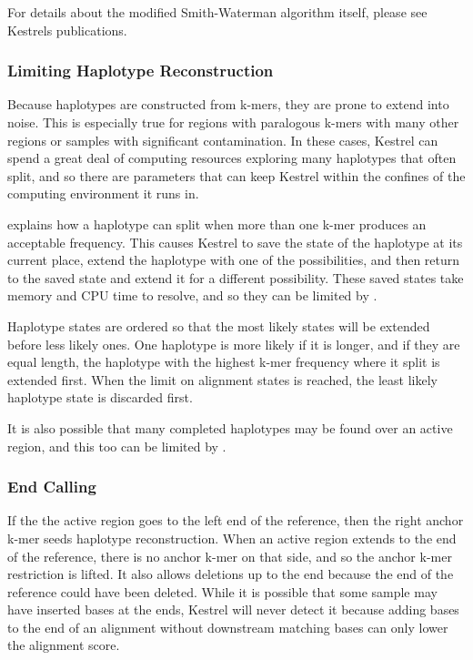 For details about the modified Smith-Waterman algorithm itself, please see Kestrels publications.


\subsubsection{Limiting Haplotype Reconstruction}
\label{sec.process.haplo.limits}

Because haplotypes are constructed from k-mers, they are prone to extend into noise. This is especially true for regions with paralogous k-mers with many other regions or samples with significant contamination. In these cases, Kestrel can spend a great deal of computing resources exploring many haplotypes that often split, and so there are parameters that can keep Kestrel within the confines of the computing environment it runs in.

 explains how a haplotype can split when more than one k-mer produces an acceptable frequency. This causes Kestrel to save the state of the haplotype at its current place, extend the haplotype with one of the possibilities, and then return to the saved state and extend it for a different possibility. These saved states take memory and CPU time to resolve, and so they can be limited by .

Haplotype states are ordered so that the most likely states will be extended before less likely ones. One haplotype is more likely if it is longer, and if they are equal length, the haplotype with the highest k-mer frequency where it split is extended first. When the limit on alignment states is reached, the least likely haplotype state is discarded first.

It is also possible that many completed haplotypes may be found over an active region, and this too can be limited by .


\subsubsection{End Calling}
\label{sec.process.haplo.ends}

If the the active region goes to the left end of the reference, then the right anchor k-mer seeds haplotype reconstruction. When an active region extends to the end of the reference, there is no anchor k-mer on that side, and so the anchor k-mer restriction is lifted. It also allows deletions up to the end because the end of the reference could have been deleted. While it is possible that some sample may have inserted bases at the ends, Kestrel will never detect it because adding bases to the end of an alignment without downstream matching bases can only lower the alignment score.


